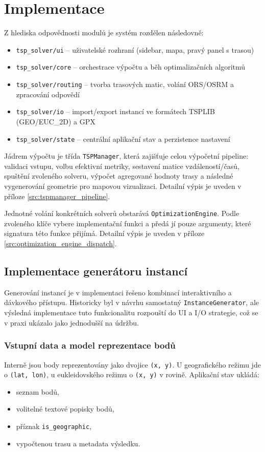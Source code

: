 \chapter{Implementace}
Z hlediska odpovědnosti modulů je systém rozdělen následovně:
\begin{itemize}
    \item \texttt{tsp\_solver/ui} -- uživatelské rozhraní (sidebar, mapa, pravý panel s trasou)
    \item \texttt{tsp\_solver/core} -- orchestrace výpočtu a běh optimalizačních algoritmů
    \item \texttt{tsp\_solver/routing} -- tvorba trasových matic, volání ORS/OSRM a zpracování odpovědí
    \item \texttt{tsp\_solver/io} -- import/export instancí ve formátech TSPLIB (GEO/EUC\_2D) a GPX
    \item \texttt{tsp\_solver/state} -- centrální aplikační stav a perzistence nastavení
\end{itemize}

Jádrem výpočtu je třída \texttt{TSPManager}, která zajišťuje celou výpočetní pipeline: validaci vstupu, volbu efektivní metriky, sestavení matice vzdáleností/časů, spuštění zvoleného solveru, výpočet agregované hodnoty trasy a následné vygenerování geometrie pro mapovou vizualizaci. Detailní výpis je uveden v příloze \ref{src:tspmanager_pipeline}.

Jednotné volání konkrétních solverů obstarává \texttt{OptimizationEngine}. Podle zvoleného klíče vybere implementační funkci a předá jí pouze argumenty, které signatura této funkce přijímá. Detailní výpis je uveden v příloze \ref{src:optimization_engine_dispatch}.

\section{Implementace generátoru instancí}
Generování instancí je v implementaci řešeno kombinací interaktivního a dávkového přístupu. Historicky byl v návrhu samostatný \texttt{InstanceGenerator}, ale výsledná implementace tuto funkcionalitu rozpouští do UI a I/O strategie, což se v praxi ukázalo jako jednodušší na údržbu.

\subsection{Vstupní data a model reprezentace bodů}
Interně jsou body reprezentovány jako dvojice \texttt{(x, y)}. U geografického režimu jde o \texttt{(lat, lon)}, u eukleidovského režimu o \texttt{(x, y)} v rovině. Aplikační stav ukládá:
\begin{itemize}
    \item seznam bodů,
    \item volitelné textové popisky bodů,
    \item příznak \texttt{is\_geographic},
    \item vypočtenou trasu a metadata výsledku.
\end{itemize}


